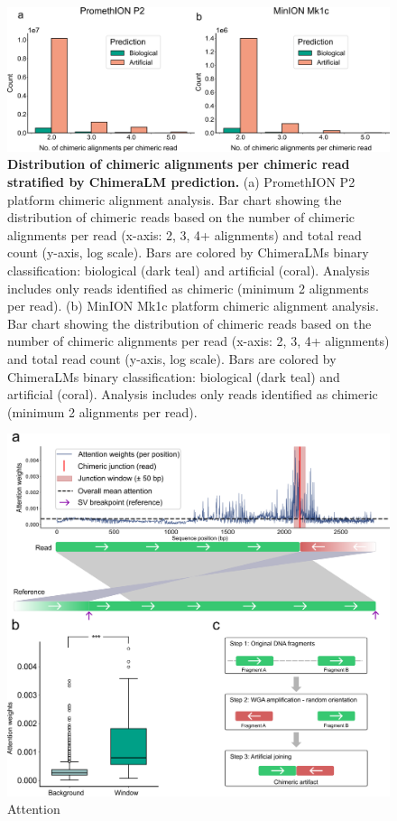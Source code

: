 \documentclass[pdflatex,sn-nature]{sn-jnl}%
\theoremstyle{thmstyleone}%
\theoremstyle{thmstyletwo}%
\theoremstyle{thmstylethree}%
\begin{document}
\begin{figure}[!ht]
	\begin{center}
		\includegraphics[width=\textwidth]{final_figures/sf2}
	\end{center}
	\caption{{\bf Distribution of chimeric alignments per chimeric read stratified by ChimeraLM prediction.}
		(a) PromethION P2 platform chimeric alignment analysis. Bar chart showing the distribution of chimeric reads based on the number of chimeric alignments per read (x-axis: 2, 3, 4+ alignments) and total read count (y-axis, log scale). Bars are colored by ChimeraLM\textquotesingle s binary classification: biological (dark teal) and artificial (coral). Analysis includes only reads identified as chimeric (minimum 2 alignments per read).
		(b) MinION Mk1c platform chimeric alignment analysis. Bar chart showing the distribution of chimeric reads based on the number of chimeric alignments per read (x-axis: 2, 3, 4+ alignments) and total read count (y-axis, log scale). Bars are colored by ChimeraLM\textquotesingle s binary classification: biological (dark teal) and artificial (coral). Analysis includes only reads identified as chimeric (minimum 2 alignments per read). }\label{fig:sf2}
\end{figure}

\begin{figure}[!ht]
	\begin{center}
		\includegraphics[width=\textwidth]{final_figures/sf3}
	\end{center}
	\caption{Attention}\label{fig:sf3}
\end{figure}
\end{document}
